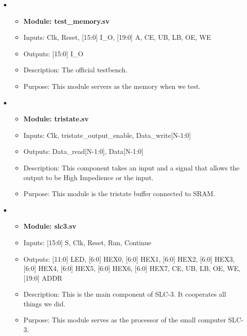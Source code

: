 \documentclass[11pt]{article}
\begin{document}
\begin{itemize}
    \item
    \begin{itemize}
        \item \textbf{Module: test\_memory.sv}
        \item Inputs: Clk, Reset, [15:0] I\_O, [19:0] A, CE, UB, LB, OE, WE
        \item Outputs: [15:0] I\_O
        \item Description: The official testbench.
        \item Purpose: This module servers as the memory when we test.
    \end{itemize}

    \item
    \begin{itemize}
        \item \textbf{Module: tristate.sv}
        \item Inputs: Clk, tristate\_output\_enable, Data\_write[N-1:0]
        \item Outputs: Data\_read[N-1:0], Data[N-1:0]
        \item Description: This component takes an input and a signal that allows the output to be High Impedience or the input.
        \item Purpose: This module is the tristate buffer connected to SRAM.
    \end{itemize}

    \item
    \begin{itemize}
        \item \textbf{Module: slc3.sv}
        \item Inputs: [15:0] S, Clk, Reset, Run, Continue
        \item Outputs: [11:0] LED, [6:0] HEX0, [6:0] HEX1, [6:0] HEX2, [6:0] HEX3, [6:0] HEX4, [6:0] HEX5, [6:0] HEX6, [6:0] HEX7, CE, UB, LB, OE, WE, [19:0] ADDR
        \item Description: This is the main component of SLC-3. It cooperates all things we did.
        \item Purpose: This module serves as the processor of the small computer SLC-3.
    \end{itemize}



\end{itemize}
\end{document}
